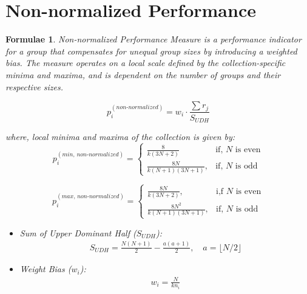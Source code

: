 \documentclass[a4paper,fleqn,review]{cas-sc}
\newtheorem{theorem}{Formulae}
\begin{document}
\section{Non-normalized Performance}

\begin{theorem} \label{def:non-normalized-performance-measure}
	\textit{Non-normalized Performance Measure} is a performance indicator for a group that compensates for unequal group sizes by introducing a weighted bias. The measure operates on a local scale defined by the collection-specific minima and maxima, and is dependent on the number of groups and their respective sizes.
	
	\begin{equation}
		p_i^{(non\text{-}normalized)} = w_i \cdot \frac{\sum r_j}{ S_{UDH} }
		\label{eq:non-normalized}
	\end{equation}
	
	where, local minima and maxima of the collection is given by:
	\begin{equation}
	p_i^{(min, \, non\text{-}normalized)} = 
	\begin{cases}
			\frac{8}{k(3N + 2)}
			 & \text{if, } N \text{ is even} \\
			\frac{8N}{k (N+1)(3N+1)}, & \text{if, } N \text{ is odd}
	\end{cases}
	\end{equation}
	
	\begin{equation}
		p_i^{(max, \, non\text{-}normalized)} = 
		\begin{cases}
			\frac{8N}{k(3N + 2)}, & \text{i,f } N \text{ is even} \\
			\frac{8N^2}{k (N+1)(3N+1)}, & \text{if, } N \text{ is odd}
		\end{cases}
	\end{equation}
	
	
	\begin{itemize}
		\item Sum of Upper Dominant Half ($S_{UDH}$):
		\begin{align}
			S_{UDH} = \frac{N(N+1)}{2} - \frac{a(a+1)}{2}, \quad a = \lfloor N/2 \rfloor
		\end{align}
		\item Weight Bias ($w_i$):
		\begin{align}
			w_i = \frac{N}{k n_i}
		\end{align}
	\end{itemize}
	
\end{theorem}
\end{document}
